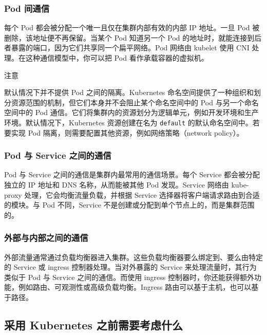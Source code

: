 \subsubsection{Pod 间通信}

\label{idx:1997}
\label{idx:1998}
每个 Pod 都会被分配一个唯一且仅在集群内部有效的内部 IP 地址。一旦 Pod 被删除，该地址便不再保留。当某个 Pod 知道另一个 Pod 的地址时，就能连接到后者暴露的端口，因为它们共享同一个扁平网络。Pod 网络由 kubelet 使用 CNI 处理。在这种通信模型中，你可以把 Pod 看作承载容器的虚拟机。

\begin{myNotic}{注意}

默认情况下并不提供 Pod 之间的隔离。Kubernetes 命名空间提供了一种组织和划分资源范围的机制，但它们本身并不会阻止某个命名空间中的 Pod 与另一个命名空间中的 Pod 通信。它们将集群内的资源划分为逻辑单元，例如开发环境和生产环境。默认情况下，Kubernetes 资源创建在名为 \texttt{default} 的默认命名空间中。若要实现 Pod 隔离，则需要配置其他资源，例如网络策略（network policy）。
\end{myNotic}

\subsubsection{Pod 与 Service 之间的通信}

\label{idx:1999}
\label{idx:2000}
Pod 与 Service 之间的通信是集群内最常用的通信场景。每个 Service 都会被分配独立的 IP 地址和 DNS 名称，从而能被其他 Pod 发现。Service 网络由 kube-proxy 处理，它会均衡流量负载，并根据 Service 选择器将客户端请求路由到合适的模块。与 Pod 不同，Service 不是创建或分配到单个节点上的，而是集群范围的。

\subsubsection{外部与内部之间的通信}

\label{idx:2001}
\label{idx:2002}
外部流量通常通过负载均衡器进入集群。这些负载均衡器要么绑定到、要么由特定的 Service 或 ingress 控制器处理。当对外暴露的 Service 来处理流量时，其行为类似于 Pod 与 Service 之间的通信。而使用 ingress 控制器时，你还能获得额外功能，例如路由、可观测性或高级负载均衡。Ingress 路由可以基于主机，也可以基于路径。

\subsection{采用 Kubernetes 之前需要考虑什么}


